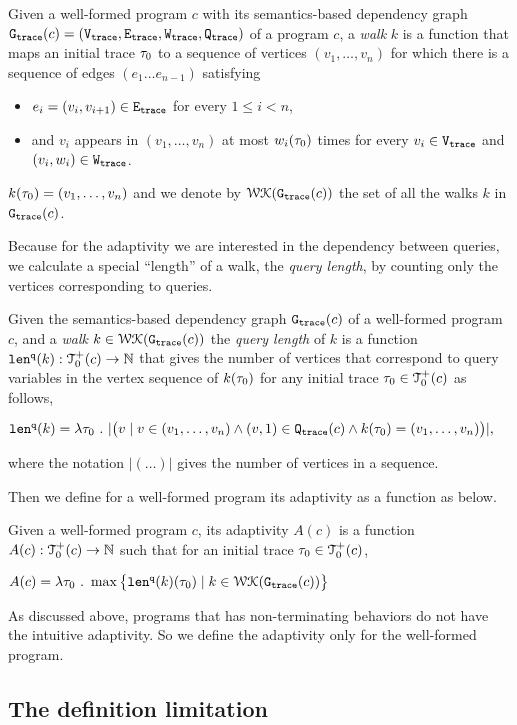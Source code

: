 \begin{defn}[Walk]
\label{def:finitewalk}
Given a well-formed program $c$ with its semantics-based dependency graph $\mathtt{{G_{trace}}}({c}) = (\mathtt{{V_{trace}}}, \mathtt{{E_{trace}}}, \mathtt{{W_{trace}}}, \mathtt{{Q_{trace}}})$ of a program $c$, a \emph{walk} $k$ is a function that maps an initial trace $\mathtt{\tau}_0$ to a sequence of vertices $(v_1, \ldots, v_{n})$
for which there is a sequence of edges $(e_1 \ldots e_{n - 1})$  satisfying
\begin{itemize}
\item $e_i = (v_{i},v_{i + 1}) \in \mathtt{{E_{trace}}}$ for every $1 \leq i < n$,
\item and $v_i$ appears in $(v_1, \ldots, v_{n})$ at most $w_i(\mathtt{\tau}_0)$ times for every $v_i \in \mathtt{{V_{trace}}}$ and $(v_i, w_i) \in \mathtt{{W_{trace}}}$.  
\end{itemize}
$k(\mathtt{\tau}_0) = (v_1, \ldots, v_{n})$
and we denote by $\mathcal{WK}(\mathtt{{G_{trace}}}(c))$
the set of all the walks $k$ in $\mathtt{{G_{trace}}}(c)$.
\end{defn} 
Because for the adaptivity
we are interested in the dependency between queries,
we calculate a special ``length'' of a walk, the \emph{query length},  by counting only the vertices
corresponding to queries.
\begin{defn}
\label{def:qlen}
Given 
the semantics-based dependency graph $\mathtt{{G_{trace}}}({c})$ of a well-formed program $c$,
 and a \emph{walk} 
 $k \in \mathcal{WK}(\mathtt{{G_{trace}}}(c))$ 
the \emph{query length} of $k$ is a function $\mathtt{len}^{\tt q}(k):\mathcal{T}^{+}_0(c) \to \mathbb{N}$ that 
gives
the number of vertices that correspond to query variables in the vertex sequence of $k(\mathtt{\tau}_0)$
for any initial trace $\mathtt{\tau}_0 \in \mathcal{T}^{+}_0(c)$ as follows, 
\begin{center}
   $
  \mathtt{len}^{\tt q}(k) = \lambda \mathtt{\tau}_0 ~.~ |\big( v \mid v \in (v_1, \ldots, v_{n}) \land (v, 1) \in \mathtt{{Q_{trace}}}(c) 
  \land k(\mathtt{\tau}_0) = (v_1, \ldots, v_{n}) \big)|,
$
\end{center}
where the notation $| (\ldots) |$ gives the number of vertices in a sequence.
\end{defn}
Then we define for a well-formed program its adaptivity as a function as below.
\begin{defn}
    \label{def:trace_adapt}
    Given a well-formed program ${c}$, 
    its adaptivity $A(c)$ is a function 
    $A(c) : \mathcal{T}^{+}_0(c)\to \mathbb{N}$ such that for an
    initial trace $\mathtt{\tau}_0 \in \mathcal{T}^{+}_0(c)$, 
\begin{center}
$
    A(c) = \lambda \mathtt{\tau}_0 ~.~ \max \big 
    \{ \mathtt{len}^{\tt q}(k)(\mathtt{\tau}_0) \mid k \in \mathcal{WK}(\mathtt{{G_{trace}}}(c)) \big \} 
$
\end{center}
\end{defn}
As discussed above, programs that has non-terminating behaviors do not have the intuitive adaptivity. So we define the adaptivity only for the well-formed program.

\subsection{The definition limitation}
